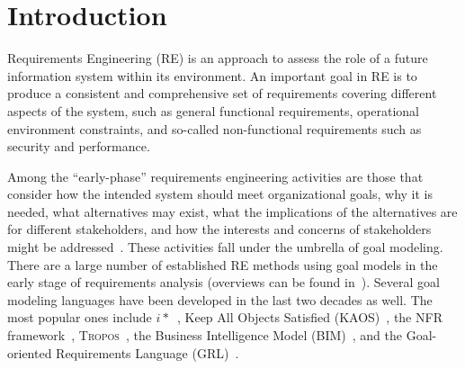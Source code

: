 \section{Introduction}
\label{sect:introduction}

Requirements Engineering (RE) is an approach to assess the role of a future information system within its environment. An important goal in RE is to produce a consistent and comprehensive set of requirements covering different aspects of the system, such as general functional requirements, operational environment constraints, and so-called non-functional requirements such as security and performance. 

Among the ``early-phase'' requirements engineering activities are those that consider how the intended system should meet organizational goals, why it is needed, what alternatives may exist, what the implications of the alternatives are for different stakeholders, and how the interests and concerns of stakeholders might be addressed~\cite{yu1997towards}. These activities fall under the umbrella of goal modeling. There are a large number of established RE methods using goal models in the early stage of requirements analysis (overviews can be found in~\cite{kavakliL05,van2001goal}). Several goal modeling languages have been developed in the last two decades as well. The most popular ones include $i*$~\cite{yu1997towards}, Keep All Objects Satisfied (KAOS)~\cite{van2008requirements}, the NFR framework~\cite{chung2012non}, \textsc{Tropos}~\cite{giorgini2005goal}, the Business Intelligence Model (BIM)~\cite{horkoff2014strategic}, and the Goal-oriented Requirements Language (GRL)~\cite{Amyot:2010:EGM:1841349.1841356}.



